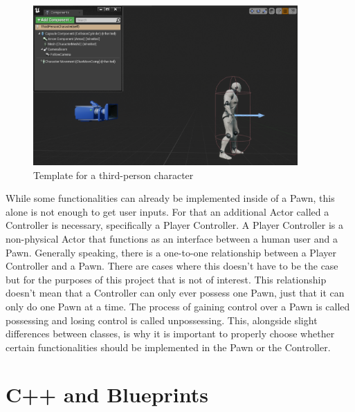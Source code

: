 \begin{figure}[htpb]
	\centering
	\includegraphics[width=0.9\textwidth]{fig/UnrealCharacter.png}
	\caption[Template for third person character]{Template for a third-person character\protect}
	\label{fig:UnrealCharacter}
\end{figure}

While some functionalities can already be implemented inside of a Pawn, this alone is not enough to get user inputs. For that an additional Actor called a Controller is necessary, specifically a Player Controller. A Player Controller is a non-physical Actor that functions as an interface between a human user and a Pawn\cite{bib:UEControllers}. Generally speaking, there is a one-to-one relationship between a Player Controller and a Pawn. There are cases where this doesn't have to be the case but for the purposes of this project that is not of interest. This relationship doesn't mean that a Controller can only ever possess one Pawn, just that it can only do one Pawn at a time. The process of gaining control over a Pawn is called possessing and losing control is called unpossessing. This, alongside slight differences between classes, is why it is important to properly choose whether certain functionalities should be implemented in the Pawn or the Controller.

\section{C++ and Blueprints}

